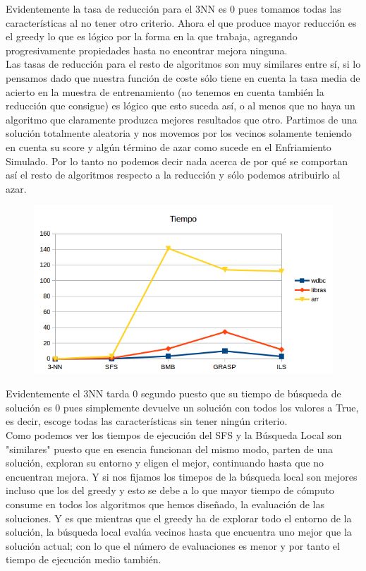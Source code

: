 \documentclass[10pt,a4paper]{article}
\begin{document}
Evidentemente la tasa de reducción para el 3NN es 0 pues tomamos todas las características al no tener otro criterio. Ahora el que produce mayor reducción es el greedy lo que es lógico por la forma en la que trabaja, agregando progresivamente propiedades hasta no encontrar mejora ninguna.\\

Las tasas de reducción para el resto de algoritmos son muy similares entre sí, si lo pensamos dado que nuestra función de coste sólo tiene en cuenta la tasa media de acierto en la muestra de entrenamiento (no tenemos en cuenta también la reducción que consigue) es lógico que esto suceda así, o al menos que no haya un algoritmo que claramente produzca mejores resultados que otro. Partimos de una solución totalmente aleatoria y nos movemos por los vecinos solamente teniendo en cuenta su score y algún término de azar como sucede en el Enfriamiento Simulado. Por lo tanto no podemos decir nada acerca de por qué se comportan así el resto de algoritmos respecto a la reducción y sólo podemos atribuirlo al azar.\\


\begin{figure}[H]
\centering
\includegraphics[width=130mm]{tiempo.png}
\end{figure}


Evidentemente el 3NN tarda 0 segundo puesto que su tiempo de búsqueda de solución es 0 pues simplemente devuelve un solución con todos los valores a True, es decir, escoge todas las características sin tener ningún criterio.\\

Como podemos ver los tiempos de ejecución del SFS y la Búsqueda Local son "similares" puesto que en esencia funcionan del mismo modo, parten de una solución, exploran su entorno y eligen el mejor, continuando hasta que no encuentran mejora. Y si nos fijamos los timepos de la búsqueda local son mejores incluso que los del greedy y esto se debe a lo que mayor tiempo de cómputo consume en todos los algoritmos que hemos diseñado, la evaluación de las soluciones. Y es que mientras que el greedy ha de explorar todo el entorno de la solución, la búsqueda local evalúa vecinos hasta que encuentra uno mejor que la solución actual; con lo que el número de evaluaciones es menor y por tanto el tiempo de ejecución medio también.\\
\end{document}
